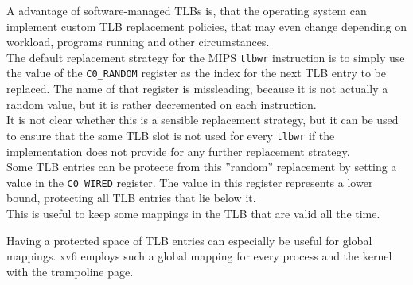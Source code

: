 A advantage of software-managed TLBs is, that the operating system can implement custom
TLB replacement policies, that may even change depending on workload, programs running
and other circumstances.\\
The default replacement strategy for the MIPS \texttt{tlbwr} instruction is to simply
use the value of the \texttt{C0\_RANDOM} register as the index for the next TLB entry
to be replaced. The name of that register is missleading, because it is not actually a
random value, but it is rather decremented on each instruction\cite{heiserAnatomyHighPerformanceMicrokernel}.\\
It is not clear whether this is a sensible replacement strategy,
but it can be used to ensure that the same TLB slot is not used for every \texttt{tlbwr} if the implementation
does not provide for any further replacement strategy.\\
Some TLB entries can be protecte from this ''random'' replacement by setting a value in the \texttt{C0\_WIRED}
register. The value in this register represents a lower bound, protecting all TLB entries that lie below it.\\
This is useful to keep some mappings in the TLB that are valid all the time.

Having a protected space of TLB entries can especially be useful for global mappings. xv6 employs such a global
mapping for every process and the kernel with the trampoline page.






